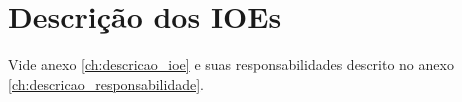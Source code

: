 \chapter{Descrição dos IOEs}
Vide anexo \ref{ch:descricao_ioe} e suas responsabilidades descrito no anexo \ref{ch:descricao_responsabilidade}.